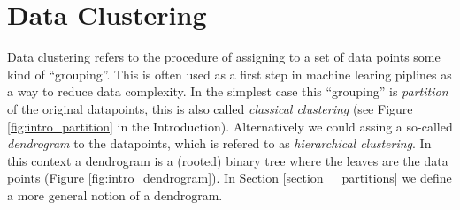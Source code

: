 \chapter{Data Clustering}
\label{chapter__dataclustering}

Data clustering refers to the procedure of assigning to a set of data points some kind of ``grouping''. 
This is often used as a first step in machine learing piplines as a way to reduce data complexity.
In the simplest case this ``grouping'' is \emph{partition} of the original datapoints, this is also called \emph{classical clustering} (see Figure \ref{fig:intro_partition} in the Introduction). Alternatively we could assing a so-called \emph{dendrogram}
to the datapoints, which is refered to as \emph{hierarchical clustering}.  In this context a dendrogram is a (rooted) binary tree where the leaves are the data points (Figure \ref{fig:intro_dendrogram}). 
In Section \ref{section__partitions} we define a more general notion of a dendrogram.



        

        
